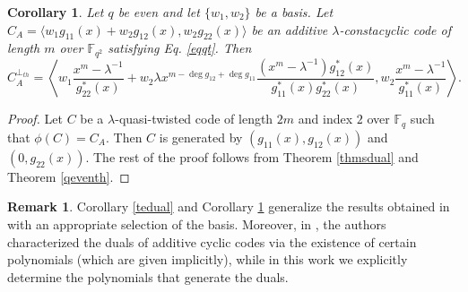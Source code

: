 \documentclass[12 pt]{extarticle}
\numberwithin{equation}{section}
\newtheorem{corollary}[theorem]{Corollary}
\theoremstyle{definition}
\newtheorem{remark}{Remark}[section]
\begin{document}
\begin{corollary}\label{thdual}
    Let $q$ be even and let $\{w_1,w_2\} $ be a basis. Let $C_A=\langle w_1g_{11}(x)+w_2g_{12}(x),w_2g_{22}(x)\rangle$ be an additive $\lambda$-constacyclic code of length $m$ over $\mathbb{F}_{q^2}$ satisfying Eq. \ref{eqqt}. Then
    $$C_A^{\perp_{th}}=\left \langle  w_1\frac{x^m-\lambda^{-1}}{g_{22}^*(x)}+w_2\lambda x^{m-\deg g_{12}+\deg g_{11}}\frac{(x^m-\lambda^{-1})g_{12}^*(x)}{g_{11}^*(x)g_{22}^*(x)},  w_2\frac{x^m-\lambda^{-1}}{g_{11}^*(x)}\right \rangle.$$
\end{corollary}
\begin{proof}
    Let $C$ be a $\lambda$-quasi-twisted code of length $2m$ and index $2$ over $\mathbb{F}_q$ such that $\phi(C)=C_A$. Then $C$ is generated by $(g_{11}(x),g_{12}(x))$ and $(0,g_{22}(x))$. The rest of the proof follows from Theorem \ref{thmsdual} and Theorem \ref{qeventh}.
\end{proof}


\begin{remark}
Corollary \ref{tedual} and Corollary \ref{thdual} generalize the results obtained in \cite[Theorem 3.3 and Theorem 4.1]{shi2022} with an appropriate selection of the basis. Moreover, in \cite{shi2022}, the authors characterized the duals of additive cyclic codes via the existence of certain polynomials (which are given implicitly), while in this work we explicitly determine the polynomials that generate the duals.
\end{remark}
\end{document}
